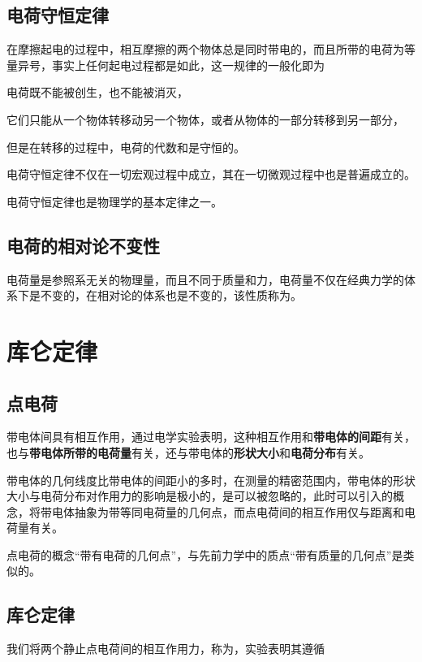 \subsection{电荷守恒定律}
在摩擦起电的过程中，相互摩擦的两个物体总是同时带电的，而且所带的电荷为等量异号，事实上任何起电过程都是如此，这一规律的一般化即为
\begin{BoxPrinciple}[电荷守恒定律]
    电荷既不能被创生，也不能被消灭，
    
    它们只能从一个物体转移动另一个物体，或者从物体的一部分转移到另一部分，

    但是在转移的过程中，电荷的代数和是守恒的。
\end{BoxPrinciple}
电荷守恒定律不仅在一切宏观过程中成立，其在一切微观过程中也是普遍成立的。

电荷守恒定律也是物理学的基本定律之一。

\subsection{电荷的相对论不变性}
电荷量是参照系无关的物理量，而且不同于质量和力，电荷量不仅在经典力学的体系下是不变的，在相对论的体系也是不变的，该性质称为。

\section{库仑定律}

\subsection{点电荷}
带电体间具有相互作用，通过电学实验表明，这种相互作用和\textbf{带电体的间距}有关，也与\textbf{带电体所带的电荷量}有关，还与带电体的\textbf{形状大小}和\textbf{电荷分布}有关。

带电体的几何线度比带电体的间距小的多时，在测量的精密范围内，带电体的形状大小与电荷分布对作用力的影响是极小的，是可以被忽略的，此时可以引入的概念，将带电体抽象为带等同电荷量的几何点，而点电荷间的相互作用仅与距离和电荷量有关。

点电荷的概念“带有电荷的几何点”，与先前力学中的质点“带有质量的几何点”是类似的。

\subsection{库仑定律}
我们将两个静止点电荷间的相互作用力，称为，实验表明其遵循

